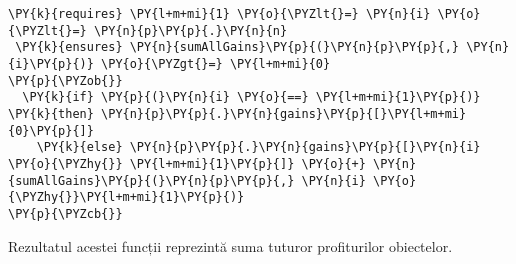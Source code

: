 \begin{sloppypar}
\begin{enumerate}
\begin{Verbatim}[commandchars=\\\{\}]
 \PY{k}{requires} \PY{l+m+mi}{1} \PY{o}{\PYZlt{}=} \PY{n}{i} \PY{o}{\PYZlt{}=} \PY{n}{p}\PY{p}{.}\PY{n}{n}
 \PY{k}{ensures} \PY{n}{sumAllGains}\PY{p}{(}\PY{n}{p}\PY{p}{,} \PY{n}{i}\PY{p}{)} \PY{o}{\PYZgt{}=} \PY{l+m+mi}{0}
\PY{p}{\PYZob{}}
  \PY{k}{if} \PY{p}{(}\PY{n}{i} \PY{o}{==} \PY{l+m+mi}{1}\PY{p}{)} \PY{k}{then} \PY{n}{p}\PY{p}{.}\PY{n}{gains}\PY{p}{[}\PY{l+m+mi}{0}\PY{p}{]} 
    \PY{k}{else} \PY{n}{p}\PY{p}{.}\PY{n}{gains}\PY{p}{[}\PY{n}{i} \PY{o}{\PYZhy{}} \PY{l+m+mi}{1}\PY{p}{]} \PY{o}{+} \PY{n}{sumAllGains}\PY{p}{(}\PY{n}{p}\PY{p}{,} \PY{n}{i} \PY{o}{\PYZhy{}}\PY{l+m+mi}{1}\PY{p}{)}
\PY{p}{\PYZcb{}}
\end{Verbatim} 
    Rezultatul acestei funcții reprezintă suma tuturor profiturilor obiectelor.
\end{enumerate}

\end{sloppypar}